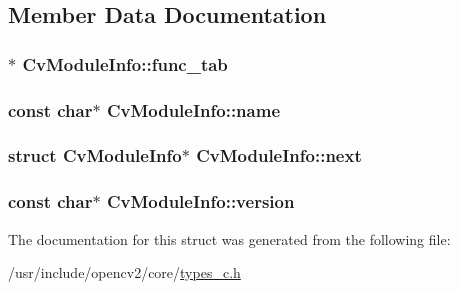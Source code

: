 \subsection{Member Data Documentation}
\hypertarget{structCvModuleInfo_a42b47b9fcdb2fb331ee37e107e485d53}{
\subsubsection[{func\-\_\-tab}]{$\ast$ Cv\-Module\-Info\-::func\-\_\-tab}}\label{structCvModuleInfo_a42b47b9fcdb2fb331ee37e107e485d53}
\hypertarget{structCvModuleInfo_a91eff988ef5fb7adc70a3829b00be41c}{
\subsubsection[{name}]{\setlength{\rightskip}{0pt plus 5cm}const char$\ast$ Cv\-Module\-Info\-::name}}\label{structCvModuleInfo_a91eff988ef5fb7adc70a3829b00be41c}
\hypertarget{structCvModuleInfo_a0af626248a90d6f5dccc2cd3c7a383a5}{
\subsubsection[{next}]{\setlength{\rightskip}{0pt plus 5cm}struct {\bf Cv\-Module\-Info}$\ast$ Cv\-Module\-Info\-::next}}\label{structCvModuleInfo_a0af626248a90d6f5dccc2cd3c7a383a5}
\hypertarget{structCvModuleInfo_ac0fd309843cd80a46d41e4838c18ad19}{
\subsubsection[{version}]{\setlength{\rightskip}{0pt plus 5cm}const char$\ast$ Cv\-Module\-Info\-::version}}\label{structCvModuleInfo_ac0fd309843cd80a46d41e4838c18ad19}


The documentation for this struct was generated from the following file\-:\begin{DoxyCompactItemize}
\item 
/usr/include/opencv2/core/\hyperlink{core_2types__c_8h}{types\-\_\-c.\-h}\end{DoxyCompactItemize}

